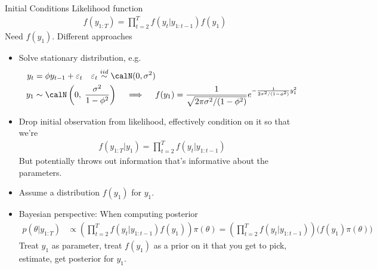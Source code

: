 \documentclass[handout]{beamer}
\newcommand{\iid}{\overset{iid}{\sim}}
\begin{document}
\begin{frame}[shrink]{Initial Conditions}
Likelihood function
\begin{align*}
  f(y_{1:T})
  =
  \prod_{t=2}^T
  f(y_t|y_{1:t-1})
  f(y_1)
\end{align*}
Need $f(y_1)$.
Different approaches
\begin{itemize}
  \item Solve stationary distribution, e.g.
    \begin{align*}
      y_t &= \phi y_{t-1} + \varepsilon_t
      \quad
      \varepsilon_t
      \iid
      \calN(0,\sigma^2)
      \\
      y_1
      &\sim
      \calN\left(0,\;
      \frac{\sigma^2}{1-\phi^2}
      \right)
      \quad\implies\quad
      f(y_1)
      =
      \frac{1}{\sqrt{2\pi\sigma^2/(1-\phi^2)}}
      e^{-\frac{1}{2\sigma^2/(1-\phi^2)}y_1^2}
    \end{align*}

  \item
    Drop initial observation from likelihood, effectively condition on
    it so that we're
    \begin{align*}
      f(y_{1:T}|y_1)
      =
      \prod_{t=2}^T
      f(y_t|y_{1:t-1})
    \end{align*}
    But potentially throws out information that's informative about the
    parameters.

  \item
    Assume a distribution $f(y_1)$ for $y_1$.

  \item
    Bayesian perspective:
    When computing posterior
    \begin{align*}
      p(\theta|y_{1:T})
      &\propto
      \left(
      \prod_{t=2}^T
      f(y_t|y_{1:t-1})
      f(y_1)
      \right)
      \pi(\theta)
      =
      \left(
      \prod_{t=2}^T
      f(y_t|y_{1:t-1})
      \right)
      \big(
      f(y_1)
      \pi(\theta)
      \big)
    \end{align*}
    Treat $y_1$ as parameter, treat $f(y_1)$ as a prior on it that
    you get to pick, estimate, get posterior for $y_1$.

\end{itemize}
\end{frame}
\end{document}
